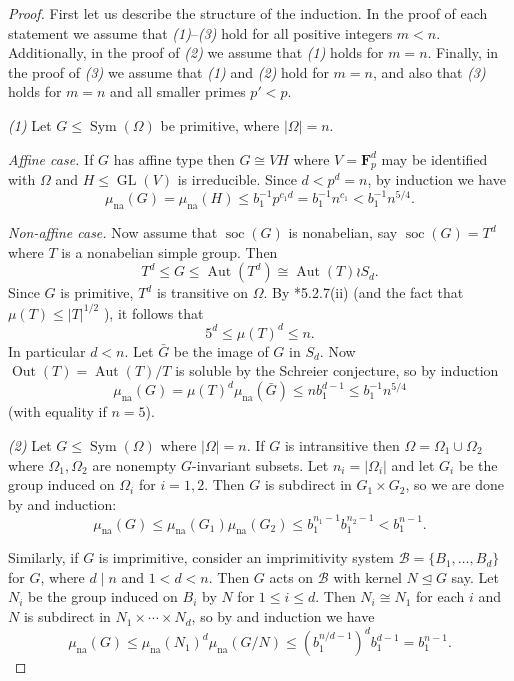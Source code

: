 \documentclass[11pt,reqno]{amsart}
\numberwithin{equation}{section}
\theoremstyle{definition}
\theoremstyle{remark}
\def\F{\mathbf{F}} %
\def\B{\mathcal{B}} %
\newcommand\opr[1]{\operatorname{#1}}
\def\Sym{\opr{Sym}}
\def\GL{\opr{GL}}
\def\Aut{\opr{Aut}}
\def\Out{\opr{Out}}
\def\nsgp{\trianglelefteq}
\def\soc{\opr{soc}}
\def\muna{\mu_{\opr{na}}}
\numberwithin{equation}{section}
\begin{document}
\begin{proof}
    First let us describe the structure of the induction.
    In the proof of each statement we assume that \emph{(1)}--\emph{(3)} hold for all positive integers $m < n$.
    Additionally, in the proof of \emph{(2)} we assume that \emph{(1)} holds for $m = n$.
    Finally, in the proof of \emph{(3)} we assume that \emph{(1)} and \emph{(2)} hold for $m = n$,
    and also that \emph{(3)} holds for $m = n$ and all smaller primes $p' < p$.

    \emph{(1)} Let $G \le \Sym(\Omega)$ be primitive, where $|\Omega| = n$.

    \emph{Affine case.} If $G$ has affine type then $G \cong VH$ where $V = \F_p^d$ may be identified with $\Omega$ and $H \le \GL(V)$ is irreducible. Since $d < p^d = n$, by induction we have
    \[
        \muna(G) = \muna(H) \le b_1^{-1} p^{c_1 d} = b_1^{-1} n^{c_1} < b_1^{-1}n^{5/4}.
    \]

    \emph{Non-affine case.}
    Now assume that $\soc(G)$ is nonabelian, say $\soc(G) = T^d$ where $T$ is a nonabelian simple group.
    Then
    \[T^d \le G \le \Aut(T^d) \cong \Aut(T) \wr S_d.\]
    Since $G$ is primitive, $T^d$ is transitive on $\Omega$.
    By \cite{kleidman--liebeck}*{5.2.7(ii)} (and the fact that $\mu(T) \le |T|^{1/2}$ \cite{lev92}),
    it follows that
    \[5^d \le \mu(T)^d \le n.\]
    In particular $d < n$.
    Let $\bar G$ be the image of $G$ in $S_d$.
    Now $\Out(T) = \Aut(T) / T$ is soluble by the Schreier conjecture, so by induction
    \[
        \muna(G) = \mu(T)^d \muna(\bar G)
        \le n b_1^{d-1}
        \le b_1^{-1} n^{5/4}
    \]
    (with equality if $n = 5$).

    \emph{(2)} Let $G \le \Sym(\Omega)$ where $|\Omega| = n$. If $G$ is intransitive then $\Omega = \Omega_1 \cup \Omega_2$ where $\Omega_1, \Omega_2$ are nonempty $G$-invariant subsets.
    Let $n_i = |\Omega_i|$ and let $G_i$ be the group induced on $\Omega_i$ for $i = 1,2$. Then $G$ is subdirect in $G_1 \times G_2$, so we are done by  and induction:
    \[
        \muna(G) \le \muna(G_1) \muna(G_2) \le b_1^{n_1 - 1} b_1^{n_2-1} < b_1^{n-1}.
    \]

    Similarly, if $G$ is imprimitive, consider an imprimitivity system $\B = \{B_1, \dots, B_d\}$ for $G$, where $d \mid n$ and $1 < d < n$. Then $G$ acts on $\B$ with kernel $N \nsgp G$ say.
    Let $N_i$ be the group induced on $B_i$ by $N$ for $1 \le i \le d$.
    Then $N_i \cong N_1$ for each $i$ and $N$ is subdirect in $N_1 \times \cdots \times N_d$, so by  and induction we have
    \[
        \muna(G) \le \muna(N_1)^d \muna(G/N) \le (b_1^{n/d-1})^d b_1^{d-1} = b_1^{n-1}.
    \]


\end{proof}
\end{document}
